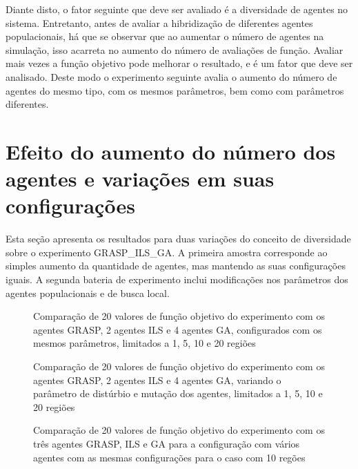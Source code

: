 Diante disto, o fator seguinte que deve ser avaliado é a diversidade de agentes no sistema. Entretanto, antes de avaliar a hibridização de diferentes agentes populacionais, há que se observar que ao aumentar o número de agentes na simulação, isso acarreta no aumento do número de avaliações de função. Avaliar mais vezes a função objetivo pode melhorar o resultado, e é um fator que deve ser analisado. Deste modo o experimento seguinte avalia o aumento do número de agentes do mesmo tipo, com os mesmos parâmetros, bem como com parâmetros diferentes. 

\section{Efeito do aumento do número dos agentes e variações em suas configurações}
\label{sec:aumentandoAgentes}

Esta seção apresenta os resultados para duas variações do conceito de diversidade sobre o experimento GRASP\_ILS\_GA. A primeira amostra corresponde ao simples aumento da quantidade de agentes, mas mantendo as suas configurações iguais.  A segunda bateria de experimento inclui modificações nos parâmetros dos agentes populacionais e de busca local.   

\begin{figure}
    \centering
    
    \caption{Comparação de 20 valores de função objetivo do experimento com os agentes GRASP, 2 agentes ILS e 4 agentes GA, configurados com os mesmos parâmetros, limitados a 1, 5, 10 e 20 regiões}
    \label{fig:A01boxplot}
\end{figure}

\begin{figure}
    \centering
    
    \caption{Comparação de 20 valores de função objetivo do experimento com os agentes GRASP, 2 agentes ILS e 4 agentes GA, variando o parâmetro de distúrbio e mutação dos agentes, limitados a 1, 5, 10 e 20 regiões}
    \label{fig:A02boxplot}
\end{figure}

\begin{figure}
    \centering
    
    \caption{Comparação de 20 valores de função objetivo do experimento com os três agentes GRASP, ILS e GA para a configuração com vários agentes com as mesmas configurações para o caso com 10 regões}
    \label{fig:A0A01boxplot}
\end{figure}



